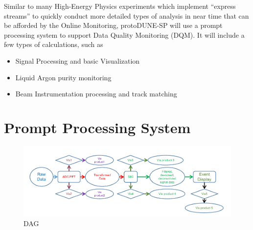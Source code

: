 \documentclass{PoS}
\begin{document}
Similar to many High-Energy Physics experiments which implement ``express streams'' to
quickly conduct more detailed types of analysis in near time that can be afforded by the Online Monitoring,
protoDUNE-SP will use a prompt processing system to support Data Quality Monitoring (DQM). It will include
a few types of calculations, such as
\begin{itemize}
\item Signal Processing and basic Visualization
\item Liquid Argon purity monitoring
\item Beam Instrumentation processing and track matching
\end{itemize}

\section{Prompt Processing System}

\begin{figure}[tb]
\centering\includegraphics[width=1.0\textwidth]{dag1.pdf}
\caption{\label{fig:dag1}DAG}
\end{figure}
\end{document}
